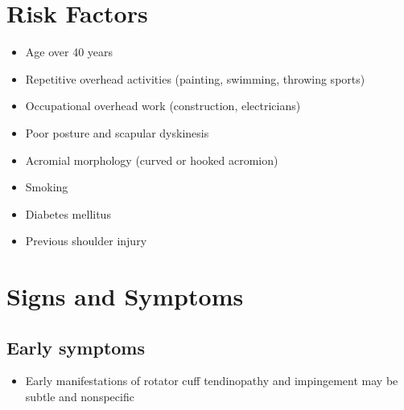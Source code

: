 \section{Risk Factors}

\begin{itemize}[noitemsep]
  \item Age over 40 years
  \item Repetitive overhead activities (painting, swimming, throwing sports)
  \item Occupational overhead work (construction, electricians)
  \item Poor posture and scapular dyskinesis
  \item Acromial morphology (curved or hooked acromion)
  \item Smoking
  \item Diabetes mellitus
  \item Previous shoulder injury
\end{itemize}

\section{Signs and Symptoms}

\subsection{Early symptoms}
\begin{itemize}[noitemsep]
  \item Early manifestations of rotator cuff tendinopathy and impingement may be subtle and nonspecific
\end{itemize}

